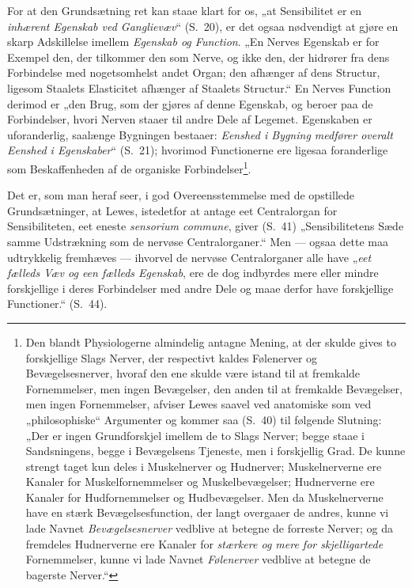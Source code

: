 \documentclass[11pt]{book}
\newcommand{\opage}[1]{\marginnote{\footnotesize\textit{[#1]}}}
\begin{document}
For at den Grundsætning ret kan staae klart for os, „at Sensibilitet
er en \emph{inhærent Egenskab ved Ganglievæv}“ (S.~20), er det ogsaa
nødvendigt at gjøre en skarp Adskillelse imellem \emph{Egenskab og
Function}. „En Nerves Egenskab er for Exempel den, der tilkommer den
som Nerve, og ikke den, der hidrører fra dens Forbindelse med
nogetsomhelst andet Organ; den afhænger af dens Structur, ligesom
Staalets Elasticitet afhænger af Staalets Structur.“ En Nerves
Function derimod er „den Brug, som der gjøres af denne Egenskab, og
beroer paa de Forbindelser, hvori Nerven staaer til andre Dele af
Legemet. Egenskaben er uforanderlig, saalænge Bygningen bestaaer:
\emph{Eenshed i Bygning medfører overalt Eenshed i Egenskaber}“
(S.~21); hvorimod Functionerne ere ligesaa foranderlige som
Beskaffenheden af de organiske
Forbindelser\footnote{%
Den blandt Physiologerne almindelig antagne Mening, at der skulde
gives to forskjellige Slags Nerver, der respectivt kaldes Følenerver
og Bevægelsesnerver, hvoraf den ene skulde være istand til at
fremkalde Fornemmelser, men ingen Bevægelser, den anden til at
fremkalde Bevægelser, men ingen Fornemmelser, afviser Lewes saavel ved
anatomiske som ved „philosophiske“ Argumenter og kommer saa (S.~40)
til følgende Slutning: „Der er ingen Grundforskjel imellem de to Slags
Nerver; begge staae i Sandsningens, begge i Bevægelsens Tjeneste, men
i forskjellig Grad. De kunne strengt taget kun deles i Muskelnerver og
Hudnerver; Muskelnerverne ere Kanaler for Muskelfornemmelser og
Muskelbevægelser; Hudnerverne ere Kanaler for Hudfornemmelser og
Hudbevægelser. Men da Muskelnerverne have en stærk
Bevægelsesfunction, der langt overgaaer de andres, kunne vi lade
Navnet \emph{Bevægelsesnerver} vedblive at betegne de forreste Nerver;
og da fremdeles Hudnerverne ere Kanaler for \emph{stærkere og mere
for\-%
skjelligartede} Fornemmelser, kunne vi lade Navnet
\emph{Følenerver} vedblive at betegne de bagerste Nerver.“
}.

\opage{368} \setcounter{footnote}{0}%
Det er, som man heraf seer, i god Overeensstemmelse med de opstillede
Grundsætninger, at Lewes, istedetfor at antage eet Centralorgan for
Sensibiliteten, eet eneste \textit{sensorium commune}, giver (S.~41)
„Sensibilitetens Sæde samme Udstrækning som de nervøse
Centralorganer.“ Men --- ogsaa dette maa udtrykkelig fremhæves ---
ihvorvel de nervøse Centralorganer alle have „\emph{eet fælleds Væv og
een fælleds Egenskab}, ere de dog indbyrdes mere eller mindre
forskjellige i deres Forbindelser med andre Dele og maae derfor have
forskjellige Functioner.“ (S.~44).
\end{document}
